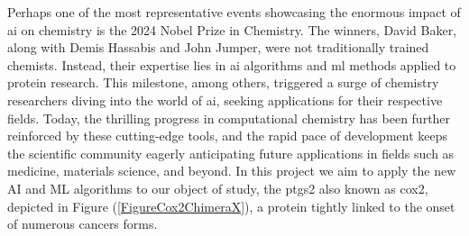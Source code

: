 \documentclass[11pt]{article}
\begin{document}
Perhaps one of the most representative events showcasing the enormous impact of \gls{ai} on chemistry is the 2024 Nobel Prize in Chemistry. The winners, David Baker\cite{NobelPrizeBale}, along with Demis Hassabis and John Jumper\cite{NobelPrizeJumper}, were not traditionally trained chemists. Instead, their expertise lies in \gls{ai} algorithms and \gls{ml} methods applied to protein research. This milestone, among others, triggered a surge of chemistry researchers diving into the world of \gls{ai}, seeking applications for their respective fields. Today, the thrilling progress in computational chemistry has been further reinforced by these cutting-edge tools\cite{MachineLearningPaper5Lipoxygenase}, and the rapid pace of development keeps the scientific community eagerly anticipating future applications in fields such as medicine, materials science, and beyond. In this project we aim to apply the new AI and ML algorithms to our object of study, the \gls{ptgs2} also known as \gls{cox2}, depicted in Figure (\ref{FigureCox2ChimeraX}), a protein tightly linked to the onset of numerous cancers forms\cite{Cox2CancerReview}. 
\end{document}
